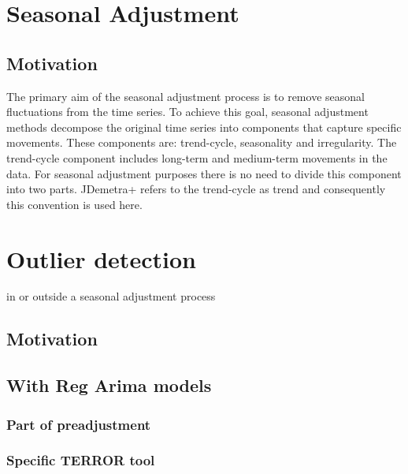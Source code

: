 \documentclass[
  letterpaper,
  DIV=11,
  numbers=noendperiod]{scrreprt}
\begin{document}
\hypertarget{seasonal-adjustment-1}{%
\chapter{Seasonal Adjustment}\label{seasonal-adjustment-1}}

\hypertarget{motivation}{%
\section{Motivation}\label{motivation}}

The primary aim of the seasonal adjustment process is to remove seasonal
fluctuations from the time series. To achieve this goal, seasonal
adjustment methods decompose the original time series into components
that capture specific movements. These components are: trend-cycle,
seasonality and irregularity. The trend-cycle component includes
long-term and medium-term movements in the data. For seasonal adjustment
purposes there is no need to divide this component into two parts.
JDemetra+ refers to the trend-cycle as trend and consequently this
convention is used here.

\hypertarget{outlier-detection}{%
\chapter{Outlier detection}\label{outlier-detection}}

in or outside a seasonal adjustment process

\hypertarget{motivation-1}{%
\section{Motivation}\label{motivation-1}}

\hypertarget{with-reg-arima-models}{%
\section{With Reg Arima models}\label{with-reg-arima-models}}

\hypertarget{part-of-preadjustment}{%
\subsection{Part of preadjustment}\label{part-of-preadjustment}}

\hypertarget{specific-terror-tool}{%
\subsection{Specific TERROR tool}\label{specific-terror-tool}}
\end{document}
